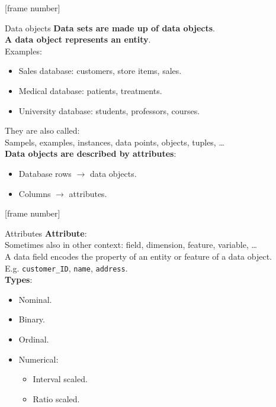 \documentclass[aspectratio=169,t]{beamer}
\begin{document}
  {
    [frame number]
    \begin{frame}{Data objects}
      \textbf{Data sets are made up of data objects}.\\
      \textbf{A data object represents an entity}.\\[0.2cm]

      Examples:
      \begin{itemize}
          \item Sales database: customers, store items, sales.
          \item Medical database: patients, treatments.
          \item University database: students, professors, courses.
      \end{itemize}

      They are also called:\\
      Sampels, examples, instances, data points, objects, tuples, \ldots\\[0.2cm]

      \textbf{Data objects are described by attributes}:
      \begin{itemize}
          \item Database rows $\rightarrow$ data objects.
          \item Columns $\rightarrow$ attributes.
      \end{itemize}
    \end{frame}
  }

  {
    [frame number]
    \begin{frame}{Attributes}
    \textbf{Attribute}:\\
    Sometimes also in other context: field, dimension, feature, variable, \ldots\\[0.2cm]
    A data field encodes the property of an entity or feature of a data object.\\
    E.g. \texttt{customer\_ID}, \texttt{name}, \texttt{address}.\\[0.5cm]

    \textbf{Types}:
    \begin{itemize}
      \item Nominal.
      \item Binary.
      \item Ordinal.
      \item Numerical:
      \begin{itemize}
        \item Interval scaled.
        \item Ratio scaled.
      \end{itemize}
    \end{itemize}
    \end{frame}
  }
\end{document}
